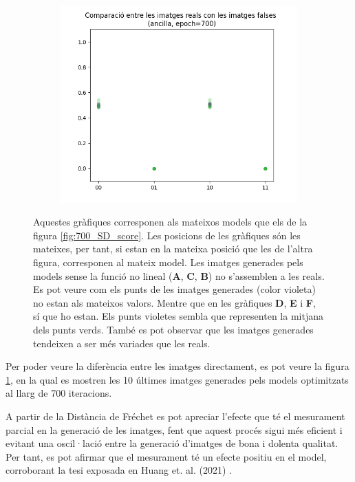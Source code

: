 \begin{figure}[H]
\begin{subfigure}[b]{.32\linewidth}
		\includegraphics[width=\linewidth]{figures/data/scatter_plot_A6.png}
		\caption{}
	\end{subfigure}
	\caption{Aquestes gràfiques corresponen als mateixos models que els de la figura \ref{fig:700_SD_score}. Les posicions de les gràfiques són les mateixes, per tant, si estan en la mateixa posició que les de l'altra figura, corresponen al mateix model. Les imatges generades pels models sense la funció no lineal (\textbf{A}, \textbf{C}, \textbf{B}) no s'assemblen a les reals. Es pot veure com els punts de les imatges generades (color violeta) no estan als mateixos valors. Mentre que en les gràfiques \textbf{D}, \textbf{E} i \textbf{F}, sí que ho estan. Els punts violetes sembla que representen la mitjana dels punts verds. També es pot observar que les imatges generades tendeixen a ser més variades que les reals.}
	\label{fig:700_images}
\end{figure}

Per poder veure la diferència entre les imatges directament, es pot veure la figura \ref{fig:700_images}, en la qual es mostren les 10 últimes imatges generades pels models optimitzats al llarg de 700 iteracions.

A partir de la Distància de Fréchet es pot apreciar l'efecte que té el mesurament parcial en la generació de les imatges, fent que aquest procés sigui més eficient i evitant una oscil·lació entre la generació d'imatges de bona i dolenta qualitat. Per tant, es pot afirmar que el mesurament té un efecte positiu en el model, corroborant la tesi exposada en Huang et. al. (2021) \cite{QGAN_exp}. 


